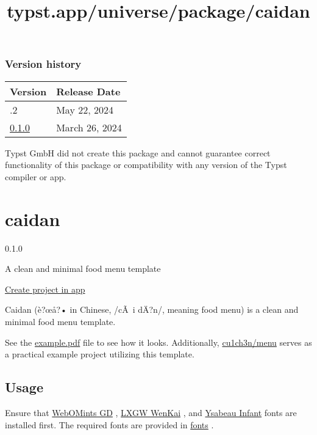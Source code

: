 \label{versions}
\subsubsection{Version history}\label{version-history}

\begin{longtable}[]{@{}ll@{}}
\toprule\noalign{}
Version & Release Date \\
\midrule\noalign{}
\endhead
\bottomrule\noalign{}
\endlastfoot
0.1.2 & May 22, 2024 \\
\href{https://typst.app/universe/package/ttt-utils/0.1.0/}{0.1.0} &
March 26, 2024 \\
\end{longtable}

Typst GmbH did not create this package and cannot guarantee correct
functionality of this package or compatibility with any version of the
Typst compiler or app.


\title{typst.app/universe/package/caidan}

\label{banner}
\label{template-thumbnail}

\section{caidan}\label{caidan}

{ 0.1.0 }

A clean and minimal food menu template

\href{/app?template=caidan&version=0.1.0}{Create project in app}

\label{readme}
Caidan (è?œå?• in Chinese, /cÃ~i dÄ?n/, meaning food menu) is a clean
and minimal food menu template.

See the
\href{https://github.com/cu1ch3n/caidan/blob/main/example.pdf}{example.pdf}
file to see how it looks. Additionally,
\href{https://github.com/cu1ch3n/menu}{cu1ch3n/menu} serves as a
practical example project utilizing this template.

\subsection{Usage}\label{usage}

Ensure that
\href{http://www.galapagosdesign.com/original/webomints.htm}{WebOMints
GD} , \href{https://github.com/lxgw/LxgwWenKai}{LXGW WenKai} , and
\href{https://fonts.google.com/specimen/Ysabeau+Infant}{Ysabeau Infant}
fonts are installed first. The required fonts are provided in
\href{https://github.com/cu1ch3n/caidan/tree/main/fonts}{fonts} .

